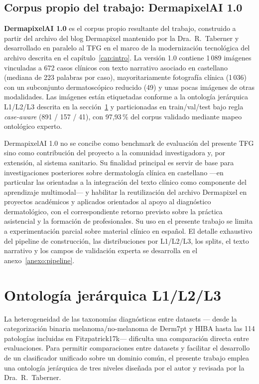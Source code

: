 \subsection{Corpus propio del trabajo: DermapixelAI 1.0}
\label{sec:dermapixel-summary}

\textbf{DermapixelAI 1.0} es el corpus propio resultante del
trabajo, construido a partir del archivo del blog Dermapixel
mantenido por la Dra.~R.~Taberner y desarrollado en paralelo al
TFG en el marco de la modernización tecnológica del archivo
descrita en el capítulo~\ref{cap:intro}. La versión 1.0 contiene
1\,089 imágenes vinculadas a 672 casos clínicos con texto narrativo
asociado en castellano (mediana de 223 palabras por caso),
mayoritariamente fotografía clínica (1\,036) con un subconjunto
dermatoscópico reducido (49) y unas pocas imágenes de otras
modalidades. Las imágenes están etiquetadas conforme a la ontología
jerárquica L1/L2/L3 descrita en la sección~\ref{sec:ontologia} y
particionadas en train/val/test bajo regla \emph{case-aware} (891
/ 157 / 41), con 97{,}93\,\% del corpus validado mediante mapeo
ontológico experto.

DermapixelAI 1.0 no se concibe como benchmark de evaluación del
presente TFG sino como contribución del proyecto a la comunidad
investigadora y, por extensión, al sistema sanitario. Su finalidad
principal es servir de base para investigaciones posteriores sobre
dermatología clínica en castellano ---en particular las orientadas
a la integración del texto clínico como componente del aprendizaje
multimodal--- y habilitar la reutilización del archivo Dermapixel
en proyectos académicos y aplicados orientados al apoyo al
diagnóstico dermatológico, con el correspondiente retorno previsto
sobre la práctica asistencial y la formación de profesionales. Su
uso en el presente trabajo se limita a experimentación parcial
sobre material clínico en español. El detalle exhaustivo del
pipeline de construcción, las distribuciones por L1/L2/L3, los
splits, el texto narrativo y los campos de validación experta se
desarrolla en el anexo~\ref{anexo:pipeline}.

\section{Ontología jerárquica L1/L2/L3}
\label{sec:ontologia}

La heterogeneidad de las taxonomías diagnósticas entre datasets ---
desde la categorización binaria melanoma/no-melanoma de Derm7pt y
HIBA hasta las 114 patologías incluidas en Fitzpatrick17k---
dificulta una comparación directa entre evaluaciones. Para permitir
comparaciones entre datasets y facilitar el desarrollo de un
clasificador unificado sobre un dominio común, el presente trabajo
emplea una ontología jerárquica de tres niveles diseñada por el autor
y revisada por la Dra.~R.~Taberner.

